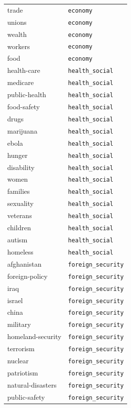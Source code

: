 \begin{longtable}{ll}
trade & \texttt{economy} \\
unions & \texttt{economy} \\
wealth & \texttt{economy} \\
workers & \texttt{economy} \\
food & \texttt{economy} \\
\midrule
health-care & \texttt{health\_social} \\
medicare & \texttt{health\_social} \\
public-health & \texttt{health\_social} \\
food-safety & \texttt{health\_social} \\
drugs & \texttt{health\_social} \\
marijuana & \texttt{health\_social} \\
ebola & \texttt{health\_social} \\
hunger & \texttt{health\_social} \\
disability & \texttt{health\_social} \\
women & \texttt{health\_social} \\
families & \texttt{health\_social} \\
sexuality & \texttt{health\_social} \\
veterans & \texttt{health\_social} \\
children & \texttt{health\_social} \\
autism & \texttt{health\_social} \\
homeless & \texttt{health\_social} \\
\midrule
afghanistan & \texttt{foreign\_security} \\
foreign-policy & \texttt{foreign\_security} \\
iraq & \texttt{foreign\_security} \\
israel & \texttt{foreign\_security} \\
china & \texttt{foreign\_security} \\
military & \texttt{foreign\_security} \\
homeland-security & \texttt{foreign\_security} \\
terrorism & \texttt{foreign\_security} \\
nuclear & \texttt{foreign\_security} \\
patriotism & \texttt{foreign\_security} \\
natural-disasters & \texttt{foreign\_security} \\
public-safety & \texttt{foreign\_security} \\

\end{longtable}
